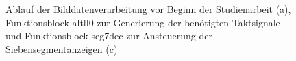 \documentclass[ngerman,12pt]{article} %
\begin{document}
{\begin{figure}[h!tb]
  \centering
  \qquad
  \qquad
  \caption[Ablauf der Bilddatenverarbeitung und Funktionsblöcke altll0 und seg7dec]{\label{pic:Ablauf der Bilddatenverarbeitung und Funktionsblock altll0}Ablauf der Bilddatenverarbeitung vor Beginn der Studienarbeit (a), Funktionsblock altll0 zur Generierung der benötigten Taktsignale und Funktionsblock seg7dec zur Ansteuerung der Siebensegmentanzeigen (c)}
\end{figure}



}
\end{document}
